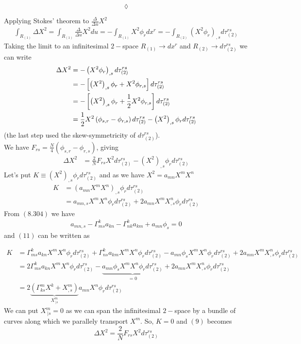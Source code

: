 $$\lozenge$$


Applying Stokes' theorem to $\frac{\Delta}{\Delta u} X^2$
\begin{align}
 \int_{R_{(1)}} \Delta X^2 =\int_{R_{(1)}} \frac{\Delta}{\Delta u} X^2 du=-\int_{R_{(1)}}X^2\phi_r  dx^{r}= - \int_{R_{(2)}} \left( X^2\phi_r\right)_{,s}d\tau_{(2)}^{rs}
\end{align}
Taking the limit to an infinitesimal $2-$space $R_{(1)}\rightarrow dx^{r}$ and $R_{(2)}\rightarrow d\tau_{(2)}^{rs}$ we can write
\begin{align}
\Delta X^2  &= - \left( X^2\phi_r\right)_{,s}d\tau_{(2)}^{rs}\\
&= - \left[\left( X^2\right)_{,s}\phi_r + X^2\phi_{r,s} \right]d\tau_{(2)}^{rs}\\
&= - \left[ \left( X^2\right)_{,s}\phi_r + \frac{1}{2} X^2\phi_{r,s} \right]d\tau_{(2)}^{rs}\\
&= \frac{1}{2} X^2\left(\phi_{s,r}- \phi_{r,s} \right)d\tau_{(2)}^{rs} -  \left( X^2\right)_{,s}\phi_rd\tau_{(2)}^{rs} 
\end{align}
(the last step used the skew-symmetricity of $d\tau_{(2)}^{rs}$).\\

We have $F_{rs} = \frac{N}{4}\left(\phi_{s,r}- \phi_{r,s} \right)$, giving
\begin{align}
\Delta X^2  &= \frac{2}{N}F_{rs}  X^2 d\tau_{(2)}^{rs} -  \left( X^2\right)_{,s}\phi_rd\tau_{(2)}^{rs} 
\end{align}
Let's put $K\equiv \left( X^2\right)_{,s}\phi_rd\tau_{(2)}^{rs} $ and as we have $X^2= a_{mn}X^mX^n$
\begin{align}
K&=\left(a_{mn}X^mX^n\right)_{,s}\phi_r d\tau_{(2)}^{rs}\\
&=a_{mn,s}X^mX^n \phi_r d\tau_{(2)}^{rs}+2a_{mn}X^mX^n_{,s}\phi_r d\tau_{(2)}^{rs}
\end{align}
From $\mathbf{(8.304)}$ we have
\begin{align*}
a_{mn,s} -\Gamma^k_{ms}a_{kn}- \Gamma^k_{nk}a_{km}+a_{mn}\phi_s=0
\end{align*} 
and $(11)$ can be written as 

\begin{align*}
K&= \Gamma^k_{ms}a_{kn}X^mX^n \phi_r d\tau_{(2)}^{rs}+ \Gamma^k_{ns}a_{km}X^mX^n \phi_r d\tau_{(2)}^{rs}-a_{mn}\phi_s X^mX^n \phi_r d\tau_{(2)}^{rs}+2a_{mn}X^mX^n_{,s}\phi_r d\tau_{(2)}^{rs}\\
&= 2\Gamma^k_{ms}a_{kn}X^mX^n \phi_r d\tau_{(2)}^{rs}-\underbrace{a_{mn}\phi_s X^mX^n \phi_r d\tau_{(2)}^{rs}}_{=0}+2a_{mn}X^mX^n_{,s}\phi_r d\tau_{(2)}^{rs}\\
&= 2\underbrace{\left(\Gamma^m_{ks}X^k +X^m_{,s}\right)}_{X^m_{\ |s}}a_{mn}X^n\phi_r d\tau_{(2)}^{rs}
\end{align*}
We can put $X^m_{\ |s}=0$ as we can  span the infinitesimal $2-$space by a bundle of curves along which we parallely transport $X^m$.
So, $K=0$ and $(9)$ becomes
$$\Delta X^2  = \frac{2}{N}F_{rs}  X^2 d\tau_{(2)}^{rs}$$

